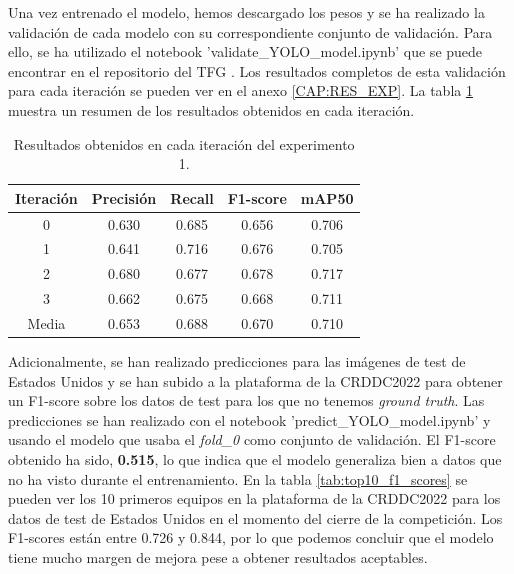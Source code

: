Una vez entrenado el modelo, hemos descargado los pesos y se ha realizado la validación de cada modelo con su correspondiente conjunto de validación. Para ello, se ha utilizado el notebook 'validate\_YOLO\_model.ipynb' que se puede encontrar en el repositorio del TFG \cite{TFG_Repository}. Los resultados completos de esta validación para cada iteración se pueden ver en el anexo \ref{CAP:RES_EXP}. La tabla \ref{tab:exp1_results} muestra un resumen de los resultados obtenidos en cada iteración.

\begin{table}[H]
    \centering
    \begin{tabular}{|c|c|c|c|c|}
        \hline
        \textbf{Iteración} & \textbf{Precisión} & \textbf{Recall} & \textbf{F1-score} & \textbf{mAP50} \\ \hline
        0       & 0.630 & 0.685 & 0.656 & 0.706 \\ \hline
        1       & 0.641 & 0.716 & 0.676 & 0.705 \\ \hline
        2       & 0.680 & 0.677 & 0.678 & 0.717 \\ \hline
        3       & 0.662 & 0.675 & 0.668 & 0.711 \\ \hline
        Media   & 0.653 & 0.688 & 0.670 & 0.710 \\ \hline
    \end{tabular}
    \caption{Resultados obtenidos en cada iteración del experimento 1.}
    \label{tab:exp1_results}
\end{table}

Adicionalmente, se han realizado predicciones para las imágenes de test de Estados Unidos y se han subido a la plataforma de la CRDDC2022 para obtener un F1-score sobre los datos de test para los que no tenemos \textit{ground truth}. Las predicciones se han realizado con el notebook 'predict\_YOLO\_model.ipynb' y usando el modelo que usaba el \textit{fold\_0} como conjunto de validación. El F1-score obtenido ha sido, \textbf{0.515}, lo que indica que el modelo generaliza bien a datos que no ha visto durante el entrenamiento. En la tabla \ref{tab:top10_f1_scores} se pueden ver los 10 primeros equipos en la plataforma de la CRDDC2022 para los datos de test de Estados Unidos en el momento del cierre de la competición. Los F1-scores están entre 0.726 y 0.844, por lo que podemos concluir que el modelo tiene mucho margen de mejora pese a obtener resultados aceptables.


